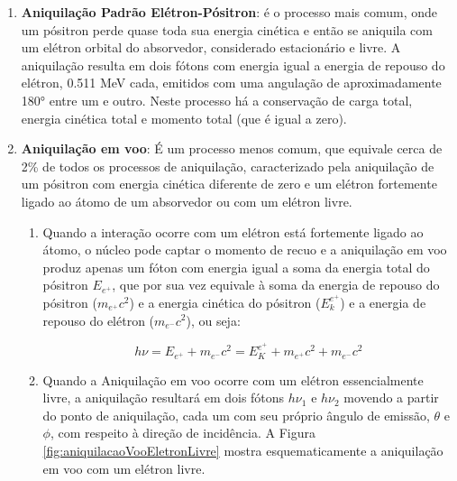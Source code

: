 \documentclass[11pt,a4paper]{article}
\begin{document}
            \begin{enumerate}
                \item \textbf{\textcolor{CarnationPink}{Aniquilação Padrão Elétron-Pósitron}}: é o processo mais comum, onde um pósitron perde quase toda sua energia cinética e então se aniquila com um elétron orbital do absorvedor, considerado estacionário e livre. A aniquilação resulta em dois fótons com energia igual a energia de repouso do elétron,  0.511 MeV cada, emitidos com uma angulação de aproximadamente \ang{180} entre um e outro. Neste processo há a conservação de carga total, energia cinética total e momento total (que é igual a zero).
                
                \item \textbf{\textcolor{CarnationPink}{Aniquilação em voo}}: É um processo menos comum, que equivale  cerca de 2\% de todos os processos de aniquilação, caracterizado pela aniquilação de um pósitron com energia cinética diferente de zero e um elétron fortemente ligado ao átomo de um absorvedor ou com um elétron livre.


                    \begin{enumerate}
                        \item Quando a interação ocorre com um elétron está fortemente ligado ao átomo, o núcleo pode captar o momento de recuo e a aniquilação em voo produz apenas um fóton com energia igual a soma da energia total do pósitron $E_{e^+}$, que por sua vez equivale à soma da energia de repouso do pósitron ($m_{e^+}c^2$) e a energia cinética do pósitron ($E_k^{e^+}$) e a energia de repouso do elétron ($m_{e^-}c^2$), ou seja:
                
                            \begin{equation}
                                h\nu = E_{e^+} + m_{e^-}c^2
                                = E_K^{e^+} + m_{e^+}c^2 + m_{e^-}c^2
                            \end{equation}

                        \item Quando a Aniquilação em voo ocorre com um elétron essencialmente livre, a aniquilação resultará em dois fótons $h\nu_1$ e $h\nu_2$ movendo a partir do ponto de aniquilação, cada um com seu próprio ângulo de emissão, $\theta$ e $\phi$, com respeito à direção de incidência. A Figura \ref{fig:aniquilacaoVooEletronLivre} mostra esquematicamente a aniquilação em voo com um elétron livre.
                        

\end{enumerate}
\end{enumerate}
\end{document}
